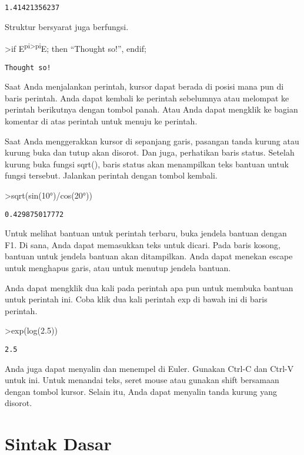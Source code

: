 \documentclass[
]{book}
\begin{document}
\begin{verbatim}
1.41421356237
\end{verbatim}

Struktur bersyarat juga berfungsi.

\textgreater if E\textsuperscript{pi\textgreater pi}E; then ``Thought so!'', endif;

\begin{verbatim}
Thought so!
\end{verbatim}

Saat Anda menjalankan perintah, kursor dapat berada di posisi mana pun di baris perintah. Anda dapat kembali ke perintah sebelumnya atau melompat ke perintah berikutnya dengan tombol panah. Atau Anda dapat mengklik ke bagian komentar di atas perintah untuk menuju ke perintah.

Saat Anda menggerakkan kursor di sepanjang garis, pasangan tanda kurung atau kurung buka dan tutup akan disorot. Dan juga, perhatikan baris status. Setelah kurung buka fungsi sqrt(), baris status akan menampilkan teks bantuan untuk fungsi tersebut. Jalankan perintah dengan tombol kembali.

\textgreater sqrt(sin(10°)/cos(20°))

\begin{verbatim}
0.429875017772
\end{verbatim}

Untuk melihat bantuan untuk perintah terbaru, buka jendela bantuan dengan F1. Di sana, Anda dapat memasukkan teks untuk dicari. Pada baris kosong, bantuan untuk jendela bantuan akan ditampilkan. Anda dapat menekan escape untuk menghapus garis, atau untuk menutup jendela bantuan.

Anda dapat mengklik dua kali pada perintah apa pun untuk membuka bantuan untuk perintah ini. Coba klik dua kali perintah exp di bawah ini di baris perintah.

\textgreater exp(log(2.5))

\begin{verbatim}
2.5
\end{verbatim}

Anda juga dapat menyalin dan menempel di Euler. Gunakan Ctrl-C dan Ctrl-V untuk ini. Untuk menandai teks, seret mouse atau gunakan shift bersamaan dengan tombol kursor. Selain itu, Anda dapat menyalin tanda kurung yang disorot.

\section{Sintak Dasar}\label{sintak-dasar}
\end{document}
